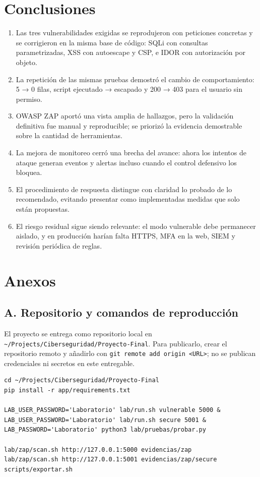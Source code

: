 \documentclass[letterpaper]{article}
\begin{document}
\section{Conclusiones}
\label{sec:org28decd5}

\begin{enumerate}
\item Las tres vulnerabilidades exigidas se reprodujeron con peticiones concretas y se
corrigieron en la misma base de código: SQLi con consultas parametrizadas, XSS con
autoescape y CSP, e IDOR con autorización por objeto.
\item La repetición de las mismas pruebas demostró el cambio de comportamiento: 5 → 0
filas, script ejecutado → escapado y 200 → 403 para el usuario sin permiso.
\item OWASP ZAP aportó una vista amplia de hallazgos, pero la validación definitiva fue
manual y reproducible; se priorizó la evidencia demostrable sobre la cantidad de
herramientas.
\item La mejora de monitoreo cerró una brecha del avance: ahora los intentos de ataque
generan eventos y alertas incluso cuando el control defensivo los bloquea.
\item El procedimiento de respuesta distingue con claridad lo probado de lo recomendado,
evitando presentar como implementadas medidas que solo están propuestas.
\item El riesgo residual sigue siendo relevante: el modo vulnerable debe permanecer
aislado, y en producción harían falta HTTPS, MFA en la web, SIEM y revisión
periódica de reglas.
\end{enumerate}
\section{Anexos}
\label{sec:orgf1d819e}

\subsection{A. Repositorio y comandos de reproducción}
\label{sec:org2949537}

El proyecto se entrega como repositorio local en \texttt{\textasciitilde{}/Projects/Ciberseguridad/Proyecto-Final}.
Para publicarlo, crear el repositorio remoto y añadirlo con \texttt{git remote add origin <URL>};
no se publican credenciales ni secretos en este entregable.

\begin{verbatim}
cd ~/Projects/Ciberseguridad/Proyecto-Final
pip install -r app/requirements.txt

LAB_USER_PASSWORD='Laboratorio' lab/run.sh vulnerable 5000 &
LAB_USER_PASSWORD='Laboratorio' lab/run.sh secure 5001 &
LAB_PASSWORD='Laboratorio' python3 lab/pruebas/probar.py

lab/zap/scan.sh http://127.0.0.1:5000 evidencias/zap
lab/zap/scan.sh http://127.0.0.1:5001 evidencias/zap/secure
scripts/exportar.sh
\end{verbatim}
\end{document}
